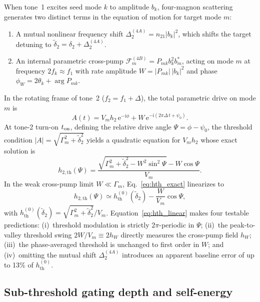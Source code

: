 \documentclass[aps,prb,reprint,superscriptaddress,floatfix]{revtex4-2}
\newcommand{\ii}{\mathrm{i}}
\newcommand{\ee}{\mathrm{e}}
\newcommand{\hth}{h_{\mathrm{th}}}
\newcommand{\wtilde}{\tilde{\delta}}
\begin{document}
When tone~1 excites seed mode $k$ to amplitude $b_k$, four-magnon scattering \cite{daquino26} generates two distinct terms in the equation of motion for target mode $m$:
\begin{enumerate}
\item A mutual nonlinear frequency shift $\Delta^{(4A)}_2=n_{21}|b_k|^2$, which shifts the target detuning to $\wtilde_2=\delta_2+\Delta^{(4A)}_2$.
\item An internal parametric cross-pump $\mathcal{F}_m^{(4B)}=P_{mk}b_k^2b_m^*$, acting on mode $m$ at frequency $2f_k\approx f_1$ with rate amplitude $W=|P_{mk}|\,|b_k|^2$ and phase $\phi_W=2\theta_k+\arg P_{mk}$.
\end{enumerate}

In the rotating frame of tone~2 ($f_2=f_1+\Delta$), the total parametric drive on mode $m$ is
\begin{equation}
A(t) = V_m h_2\,\ee^{-\ii\phi} + W\,\ee^{-\ii(2\pi\Delta\,t+\psi_0)}.
\label{eq:total_drive}
\end{equation}
At tone-2 turn-on $t_{\rm on}$, defining the relative drive angle $\Psi=\phi-\psi_0$, the threshold condition $|A|=\sqrt{\Gamma_m^2+\wtilde_2^2}$ yields a quadratic equation for $V_m h_2$ whose exact solution is
\begin{equation}
h_{2,\mathrm{th}}(\Psi) = \frac{\sqrt{\Gamma_m^2+\wtilde_2^2 - W^2\sin^2\Psi} - W\cos\Psi}{V_m}.
\label{eq:hth_exact}
\end{equation}
In the weak cross-pump limit $W\ll\Gamma_m$, Eq.~\eqref{eq:hth_exact} linearizes to
\begin{equation}
h_{2,\mathrm{th}}(\Psi) \simeq \hth^{(0)}(\wtilde_2) - \frac{W}{V_m}\cos\Psi,
\label{eq:hth_linear}
\end{equation}
with $\hth^{(0)}(\wtilde_2)=\sqrt{\Gamma_m^2+\wtilde_2^2}/V_m$. Equation~\eqref{eq:hth_linear} makes four testable predictions: (i)~threshold modulation is strictly $2\pi$-periodic in $\Psi$; (ii)~the peak-to-valley threshold swing $2W/V_m\equiv 2h_W$ directly measures the cross-pump field $h_W$; (iii)~the phase-averaged threshold is unchanged to first order in $W$; and (iv)~omitting the mutual shift $\Delta^{(4A)}_2$ introduces an apparent baseline error of up to 13\% of $\hth^{(0)}$.

\subsection{Sub-threshold gating depth and self-energy}\label{sec:th_depth}
\end{document}
